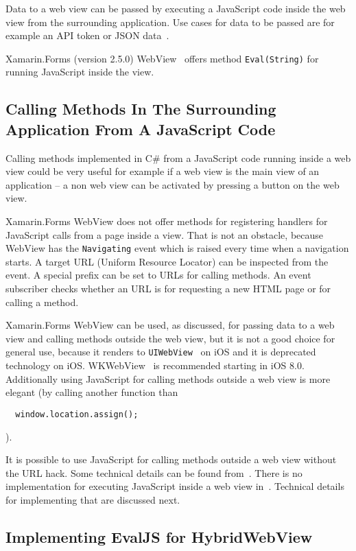 \documentclass[conference]{IEEEtran}
\newcommand{\code}[1]{{\small\texttt{#1}}}
\begin{document}
Data to a web view can be passed by executing a JavaScript code inside the web view from the surrounding application. Use cases for data to be passed are for example an API token or JSON data~\cite{json}.

Xamarin.Forms (version 2.5.0) WebView~\cite{webview} offers method \code{Eval(String)} for running JavaScript inside the view.

\subsection{Calling Methods In The Surrounding Application From A JavaScript Code}

Calling methods implemented in C\# from a JavaScript code running inside a web view could be very useful for example if a web view is the main view of an application -- a non web view can be activated by pressing a button on the web view.

Xamarin.Forms WebView does not offer methods for registering handlers for JavaScript calls from a page inside a view. That is not an obstacle, because WebView has the \code{Navigating} event which is raised every time when a navigation starts. A target URL (Uniform Resource Locator) can be inspected from the event. A special prefix can be set to URLs for calling methods. An event subscriber checks whether an URL is for requesting a new HTML page or for calling a method.

Xamarin.Forms WebView can be used, as discussed, for passing data to a web view and calling methods outside the web view, but it is not a good choice for general use, because it renders to \code{UIWebView}~\cite{uiwebview} on iOS and it is deprecated technology on iOS. WKWebView~\cite{wkwebview} is recommended starting in iOS 8.0. Additionally using JavaScript for calling methods outside a web view is more elegant (by calling another function than
\begin{lstlisting}
  window.location.assign();
\end{lstlisting}).

It is possible to use JavaScript for calling methods outside a web view without the URL hack. Some technical details can be found from~\cite{hwb}. There is no implementation for executing JavaScript inside a web view in~\cite{hwb}. Technical details for implementing that are discussed next.

\subsection{Implementing EvalJS for HybridWebView}
\end{document}
